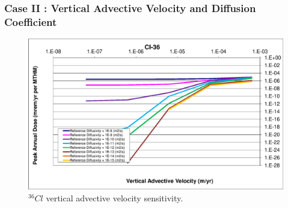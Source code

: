 \begin{frame}[c]
  \frametitle{Case II : Vertical Advective Velocity and Diffusion Coefficient}
\begin{figure}[ht!]
\centering
\includegraphics[width=\textwidth]{AdvVelAndDiffCoeffEBSFail/Cl-36-VAdvVel.eps}
\caption{$^{36}Cl$ vertical advective velocity sensitivity.}
\label{fig:VAdvVelCl36VAdvVel}
\end{figure}
\end{frame}

